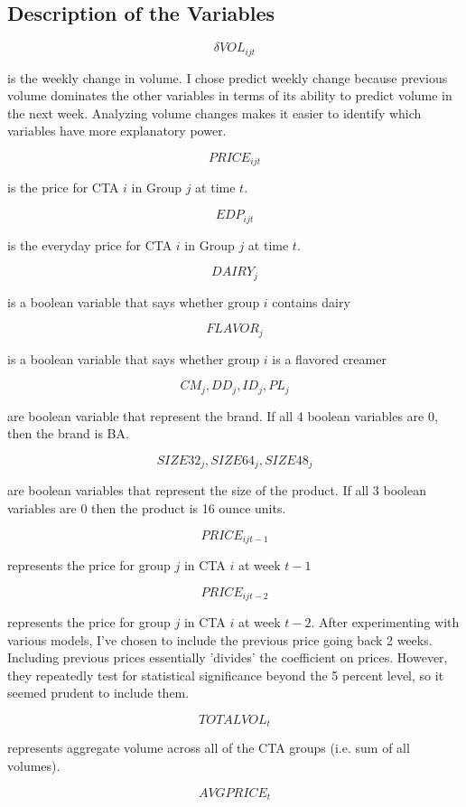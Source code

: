 \documentclass{article}
\begin{document}
\subsection{Description of the Variables}

$$\delta VOL_{ijt}$$ 

is the weekly change in volume. I chose predict weekly change because previous volume dominates the other variables in terms of its ability to predict volume in the next week. Analyzing volume changes makes it easier to identify which variables have more explanatory power.

$${PRICE}_{ijt}$$ 

is the price for CTA $i$ in Group $j$ at time $t$.

$$EDP_{ijt}$$ 

is the everyday price for CTA $i$ in Group $j$ at time $t$.

$${DAIRY}_{j}$$ 

is a boolean variable that says whether group $i$ contains dairy

$$FLAVOR_{j}$$ 

 is a boolean variable that says whether group $i$ is a flavored creamer

$$CM_{j}, DD_{j},ID_{j}, PL_{j} $$ 

 are boolean variable that represent the brand. If all 4 boolean variables are 0, then the brand is BA. 

$$SIZE32_{j}, SIZE64_{j}, SIZE48_{j}$$ 

are boolean variables that represent the size of the product. If all 3 boolean variables are 0 then the product is 16 ounce units.

$${PRICE}_{ijt-1} $$

 represents the price for group $j$ in CTA $i$ at week $t-1$

$${PRICE}_{ijt-2} $$ 

represents the price for group $j$ in CTA $i$ at week $t-2$. After experimenting with various models, I've chosen to include the previous price going back 2 weeks. Including previous prices essentially 'divides' the coefficient on prices. However, they repeatedly test for statistical significance beyond the 5 percent level, so it seemed prudent to include them.

$${TOTALVOL}_t $$ 

represents aggregate volume across all of the CTA groups (i.e. sum of all volumes).

$${AVGPRICE}_{t} $$ 
\end{document}
